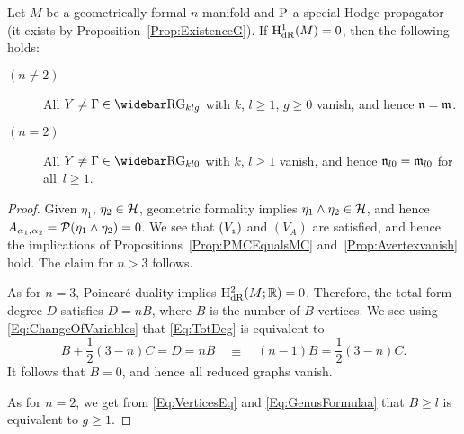 \documentclass[\MainFolder/Text.tex]{subfiles}
\begin{document}

\begin{Proposition} \label{Prop:GeomForm}
Let $M$ be a geometrically formal $n$-manifold and $\mathrm{P}$ a special Hodge propagator (it exists by Proposition~\ref{Prop:ExistenceG}). If $\mathrm{H}_{\mathrm{dR}}^1(M) = 0$, then the following holds:
\begin{description}
\item[$(n\neq 2)$]  All $Y \neq \Gamma \in \RRG_{klg}$ with $k$, $l\ge 1$, $g\ge 0$ vanish, and hence $\mathfrak{n} = \mathfrak{m}$.
\item[$(n=2)$] All $Y\neq \Gamma \in \RRG_{kl0}$ with $k$, $l\ge 1$ vanish, and hence $\mathfrak{n}_{l0} = \mathfrak{m}_{l0}$ for all~$l\ge 1$.
\end{description}
\end{Proposition}
\begin{proof}
Given $\eta_1$, $\eta_2 \in \mathcal{H}$, geometric formality implies $\eta_1 \wedge \eta_2 \in \mathcal{H}$, and hence $A_{\alpha_1,\alpha_2} = \mathcal{P}(\eta_1\wedge\eta_2) = 0$. We see that $(V_{\NOne})$ and $(V_{A})$ are satisfied, and hence the implications of Propositions~\ref{Prop:PMCEqualsMC} and~\ref{Prop:Avertexvanish} hold. The claim for $n>3$ follows.

As for $n=3$, Poincar\'e duality implies $\mathrm{H}_{\mathrm{dR}}^2(M;\mathbb{R})=0$. Therefore, the total form-degree $D$ satisfies $D= n B$, where $B$ is the number of $B$-vertices. We see using \eqref{Eq:ChangeOfVariables} that \eqref{Eq:TotDeg} is equivalent to
\begin{equation}\label{Eq:VerticesEq}
B+\frac{1}{2}(3-n) C = D = nB\quad\Equiv\quad (n-1)B = \frac{1}{2}(3-n) C.
\end{equation}
It follows that $B=0$, and hence all reduced graphs vanish.

As for $n=2$, we get from \eqref{Eq:VerticesEq} and \eqref{Eq:GenusFormulaa} that $B\ge l$ is equivalent to $g\ge 1$.
\qedhere
\end{proof}
\end{document}
